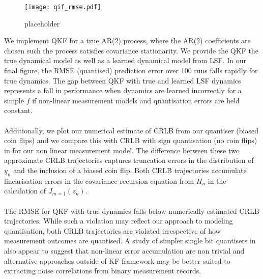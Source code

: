 \begin{figure}[h] 
	\caption{placeholder}
	\texttt{[image: qif\_rmse.pdf]} 
	\label{fig:qif}
\end{figure}

We implement QKF for a true AR(2) process, where the AR(2) coefficients are chosen such the process satisfies covariance stationarity.  We provide the QKF the true dynamical model as well as a learned dynamical model from LSF. In our final figure, the RMSE (quantised) prediction error over 100 runs falls rapidly for true dynamics. The gap between QKF with true and learned LSF dynamics represents a fall in performance when dynamics are learned incorrectly for a simple $f$ if non-linear measurement models and quantisation errors are held constant. 
\\
\\
Additionally, we plot our numerical estimate of CRLB from our quantiser (biased coin flips) and we compare this with CRLB with sign quantisation (no coin flips) in \cite{karlsson2005} for our non linear measurement model. The difference between these two approximate CRLB trajectories captures truncation errors in the distribution of $y_n$ and the inclusion of a biased coin flip. Both CRLB trajectories accumulate linearisation errors in the covariance recursion equation from $H_n$ in the calculation of $J_{m=1} (z_n)$. 
\\
\\
The RMSE for QKF with true dynamics falls below numerically estimated CRLB trajectories. While such a violation may reflect our approach to modeling quantisation, both CRLB trajectories are violated irrespective of how measurement outcomes are quantised. A study of simpler single bit quantisers in \cite{karlsson2005} also appear to suggest that non-linear error accumulation are non trivial and alternative approaches outside of KF framework may be better suited to extracting noise correlations from binary measurement records.  

